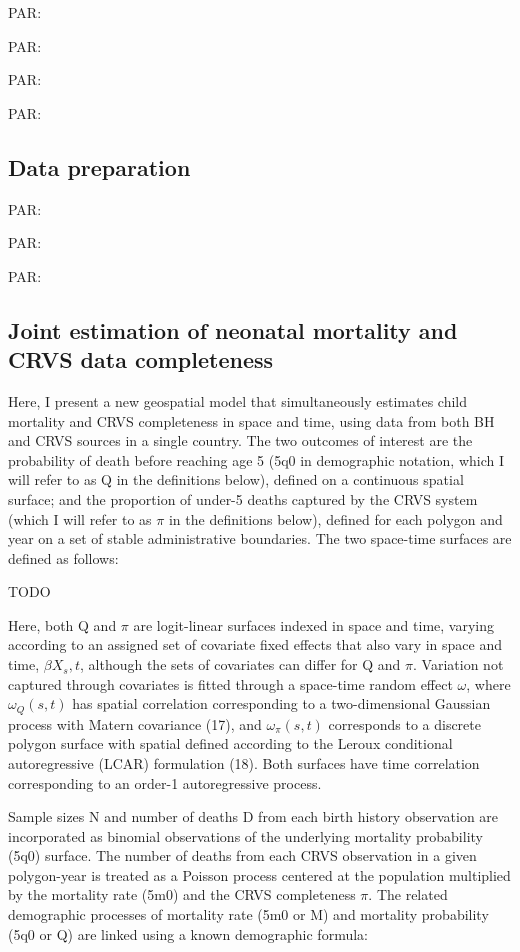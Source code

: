 \documentclass[
]{article}
\begin{document}
PAR:

PAR:

PAR:

PAR:

\hypertarget{data-preparation}{%
\subsection{Data preparation}\label{data-preparation}}

PAR:

PAR:

PAR:

\hypertarget{joint-estimation-of-neonatal-mortality-and-crvs-data-completeness}{%
\subsection{Joint estimation of neonatal mortality and CRVS data completeness}\label{joint-estimation-of-neonatal-mortality-and-crvs-data-completeness}}

Here, I present a new geospatial model that simultaneously estimates child mortality and CRVS completeness in space and time, using data from both BH and CRVS sources in a single country. The two outcomes of interest are the probability of death before reaching age 5 (5q0 in demographic notation, which I will refer to as Q in the definitions below), defined on a continuous spatial surface; and the proportion of under-5 deaths captured by the CRVS system (which I will refer to as \(\pi\) in the definitions below), defined for each polygon and year on a set of stable administrative boundaries. The two space-time surfaces are defined as follows:

TODO

Here, both Q and \(\pi\) are logit-linear surfaces indexed in space and time, varying according to an assigned set of covariate fixed effects that also vary in space and time, \(\beta X_s,t\), although the sets of covariates can differ for Q and \(\pi\). Variation not captured through covariates is fitted through a space-time random effect \(\omega\), where \(\omega_Q(s,t)\) has spatial correlation corresponding to a two-dimensional Gaussian process with Matern covariance (17), and \(\omega_\pi(s,t)\) corresponds to a discrete polygon surface with spatial defined according to the Leroux conditional autoregressive (LCAR) formulation (18). Both surfaces have time correlation corresponding to an order-1 autoregressive process.

Sample sizes N and number of deaths D from each birth history observation are incorporated as binomial observations of the underlying mortality probability (5q0) surface. The number of deaths from each CRVS observation in a given polygon-year is treated as a Poisson process centered at the population multiplied by the mortality rate (5m0) and the CRVS completeness \(\pi\). The related demographic processes of mortality rate (5m0 or M) and mortality probability (5q0 or Q) are linked using a known demographic formula:
\end{document}
